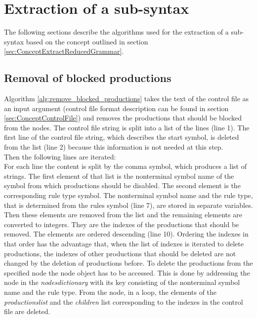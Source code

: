 \section{Extraction of a sub-syntax}\label{sec:ImplementationExtractReducedGrammar}

The following sections describe the algorithms used for the extraction of a sub-syntax based on the concept outlined in section \ref{sec:ConceptExtractReducedGrammar}.

\subsection{Removal of blocked productions}

Algorithm \ref{alg:remove_blocked_productions} takes the text of the control file as an input argument (control file format description can be found in section \ref{sec:ConceptControlFile}) and removes the productions that should be blocked from the nodes.  
The control file string is split into a list of the lines (line 1).
The first line of the control file string, which describes the start symbol, is deleted from the list (line 2) because this information is not needed at this step.\\
Then the following lines are iterated:\\
For each line the content is split by the comma symbol, which produces a list of strings.
The first element of that list is the nonterminal symbol name of the symbol from which productions should be disabled.
The second element is the corresponding rule type symbol.
The nonterminal symbol name and the rule type, that is determined from the rules symbol (line 7), are stored in separate variables.
Then these elements are removed from the list and the remaining elements are converted to integers.
They are the indexes of the productions that should be removed.
The elements are ordered descending (line 10).
Ordering the indexes in that order has the advantage that, when the list of indexes is iterated to delete productions, the indexes of other productions that should be deleted are not changed by the deletion of productions before. To delete the productions from the specified node the node object has to be accessed.
This is done by addressing the node in the \textit{nodes\textunderscore dictionary} with its key consisting of the nonterminal symbol name and the rule type.
From the node, in a loop, the elements of the \textit{productions\textunderscore list} and the \textit{children} list corresponding to the indexes in the control file are deleted.

